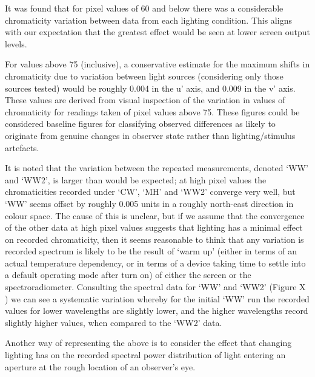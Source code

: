 
It was found that for pixel values of 60 and below there was a considerable chromaticity variation between data from each lighting condition. This aligns with our expectation that the greatest effect would be seen at lower screen output levels.



For values above 75 (inclusive), a conservative estimate for the maximum shifts in chromaticity due to variation between light sources (considering only those sources tested) would be roughly 0.004 in the u' axis, and 0.009 in the v' axis. These values are derived from visual inspection of the variation in values of chromaticity for readings taken of pixel values above 75. These figures could be considered baseline figures for classifying observed differences as likely to originate from genuine changes in observer state rather than lighting/stimulus artefacts.

It is noted that the variation between the repeated measurements, denoted `WW' and `WW2', is larger than would be expected; at high pixel values the chromaticities recorded under `CW', `MH' and `WW2' converge very well, but `WW' seems offset by roughly 0.005 units in a roughly north-east direction in colour space. The cause of this is unclear, but if we assume that the convergence of the other data at high pixel values suggests that lighting has a minimal effect on recorded chromaticity, then it seems reasonable to think that any variation is recorded spectrum is likely to be the result of `warm up' (either in terms of an actual temperature dependency, or in terms of a device taking time to settle into a default operating mode after turn on) of either the screen or the spectroradiometer. Consulting the spectral data for `WW' and `WW2' (Figure X%
) we can see a systematic variation whereby for the initial `WW' run the recorded values for lower wavelengths are slightly lower, and the higher wavelengths record slightly higher values, when compared to the `WW2' data.


Another way of representing the above is to consider the effect that changing lighting has on the recorded spectral power distribution of light entering an aperture at the rough location of an observer's eye.

